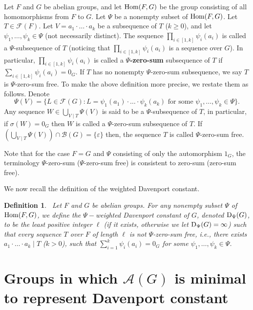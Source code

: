 \documentclass[a4paper, 12pt]{article}
\newtheorem{definition}[theorem]{Definition}
\begin{document}
Let $F$ and $G$ be abelian groups, and let ${\rm Hom}(F, G)$ be the group consisting of all homomorphisms from $F$ to $G$. Let $\Psi$ be a nonempty subset of ${\rm Hom}(F, G)$.
Let $T\in \mathcal{F}(F)$.
Let $V=a_1\cdot\ldots\cdot a_k$ be a subsequence of $T$ ($k\geq 0$), and let $\psi_1,\ldots, \psi_{k}\in \Psi$ (not necessarily distinct). The sequence $\prod\limits_{i\in [1,k]}\psi_i(a_i)$ is called a $\Psi$-subsequence of $T$ (noticing that $\prod\limits_{i\in [1,k]}\psi_i(a_i)$ is a sequence over $G$). In particular, $\prod\limits_{i\in [1,k]}\psi_i(a_i)$ is called a {\bf $\Psi$-zero-sum} subsequence of $T$ if $\sum\limits_{i\in [1,k]}\psi_i(a_i)=0_G$. If $T$ has no nonempty $\Psi$-zero-sum subsequence, we say $T$ is  $\Psi$-zero-sum free.  To make the above definition more precise, we restate them as follows.
Denote
$$\Psi(V)=\{L\in \mathcal{F}(G): L=\psi_1(a_1)\cdot\ldots\cdot \psi_k(a_k) \mbox{ for some } \psi_1,\ldots,\psi_k\in \Psi\}.$$
Any sequence $W\in \bigcup\limits_{V\mid T} \Psi(V)$ is said to be a $\Psi$-subsequence of $T$, in particular, if $\sigma(W)=0_G$ then $W$ is called a $\Psi$-zero-sum subsequence of $T$. If $(\bigcup\limits_{V\mid T} \Psi(V))\cap \mathcal B (G)=\{\varepsilon\}$ then, the sequence $T$ is called $\Psi$-zero-sum free.




Note that for the case $F=G$ and $\Psi$ consisting of only the automorphism $1_G$, the terminology $\Psi$-zero-sum ($\Psi$-zero-sum free) is consistent to zero-sum (zero-sum free).

We now recall the definition of the weighted Davenport constant.

\begin{definition} \cite{ZengYuanDiscrete, WangcommInAlgebra} \ {\sl Let $F$ and $G$ be abelian groups. For any nonempty subset $\Psi$ of ${\rm Hom}(F, G)$, we define the $\Psi-$weighted Davenport constant of $G$, denoted ${\rm D}_{\Psi}(G)$, to be the least positive integer $\ell$ (if it exists, otherwise we let ${\rm D}_{\Psi}(G)=\infty$)
such that every sequence $T$ over $F$ of length
$\ell$ is not $\Psi$-zero-sum free,  i.e.,  there exists $a_1\cdot\ldots\cdot a_k\mid T$ ($k>0$),
such that $\sum\limits_{i=1}^{k}  \psi_i(a_i)=0_G$ for some $\psi_1,\ldots,\psi_{k}\in \Psi$.}
\end{definition}








\section {Groups in which $\mathcal{A}(G)$ is minimal to represent Davenport constant}
\end{document}
